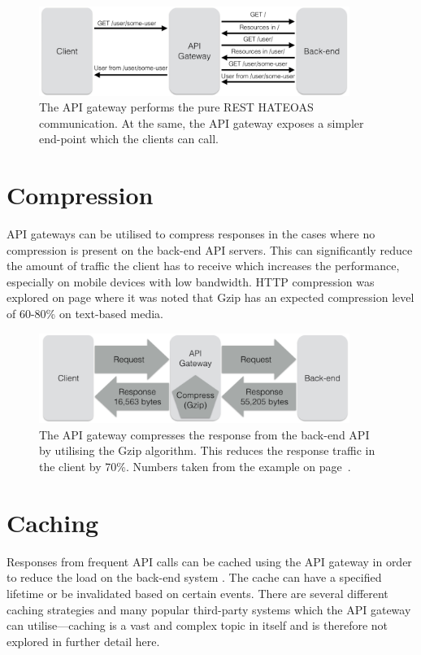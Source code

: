 \documentclass{cslthse-msc}
\begin{document}
\begin{figure}[H]
  \centering
    \begin{center}
      \includegraphics[width=0.9\textwidth]{images/api_gateway_hateoas.png}
    \end{center}
  \caption{The API gateway performs the pure REST HATEOAS communication. At the same, the API gateway exposes a simpler end-point which the clients can call.}
\end{figure}

\section{Compression}
\label{compression}
API gateways can be utilised to compress responses in the cases where no compression is present on the back-end API servers. This can significantly reduce the amount of traffic the client has to receive which increases the performance, especially on mobile devices with low bandwidth. HTTP compression was explored on page \pageref{compression} where it was noted that Gzip has an expected compression level of 60-80\% on text-based media.

\begin{figure}[H]
  \centering
    \begin{center}
      \includegraphics[width=0.9\textwidth]{images/api_gateway_compression.png}
    \end{center}
  \caption{The API gateway compresses the response from the back-end API by utilising the Gzip algorithm. This reduces the response traffic in the client by 70\%. Numbers taken from the example on page~\pageref{compression}.}
\end{figure}

\section{Caching}
\label{caching}
Responses from frequent API calls can be cached using the API gateway in order to reduce the load on the back-end system \cite[page 107]{AASG}. The cache can have a specified lifetime or be invalidated based on certain events. There are several different caching strategies and many popular third-party systems which the API gateway can utilise---caching is a vast and complex topic in itself and is therefore not explored in further detail here.
\end{document}
